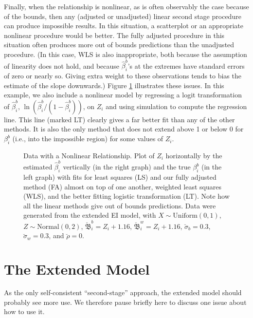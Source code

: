 \documentclass[11pt,titlepage]{article}
\newcommand{\bbeta}{{\mathfrak B}}
\newcommand{\sigmau}{\breve{\sigma}}
\newcommand{\rhou}{\breve{\rho}}
\begin{document}
Finally, when the relationship is nonlinear, as is often observably
the case because of the bounds, then any (adjusted or unadjusted)
linear second stage procedure can produce impossible results.  In this
situation, a scatterplot or an appropriate nonlinear procedure would
be better.  The fully adjusted procedure in this situation often
produces more out of bounds predictions than the unadjusted procedure.
(In this case, WLS is also inappropriate, both because the assumption
of linearity does not hold, and because $\hat\beta_i^b$'s at the
extremes have standard errors of zero or nearly so.  Giving extra
weight to these observations tends to bias the estimate of the slope
downwards.)  Figure \ref{f:nonlinear} illustrates these issues.  In
this example, we also include a nonlinear model by regressing a logit
transformation of $\hat\beta_i^b$,
$\ln(\hat\beta_i^b/(1-\hat\beta_i^b))$, on $Z_i$ and using simulation
to compute the regression line.  This line (marked LT) clearly gives a
far better fit than any of the other methods.  It is also the only
method that does not extend above 1 or below 0 for $\beta_i^b$ (i.e.,
into the impossible region) for some values of $Z_i$.
\begin{figure}[t]
  \begin{center}
    \caption{Data with a Nonlinear Relationship.  Plot of $Z_i$ 
      horizontally by the estimated $\hat\beta_i^b$ vertically (in the
      right graph) and the true $\beta_i^b$ (in the left graph) with
      fits for least squares (LS) and our fully adjusted method (FA)
      almost on top of one another, weighted least squares (WLS), and
      the better fitting logistic transformation (LT).  Note how all
      the linear methods give out of bounds predictions.  Data were
      generated from the extended EI model, with $X \sim
      \textrm{Uniform}(0,1)$, $Z \sim \textrm{Normal}(0,2)$,
      $\breve\bbeta_i^b = Z_i + 1.16$, $\breve\bbeta_i^w = Z_i +
      1.16$, $\sigmau_b = 0.3$, $\sigmau_w = 0.3$, and $\rhou = 0$.}
    \label{f:nonlinear}
  \end{center}
\end{figure}

\section{The Extended Model} \label{s:exten}

As the only self-consistent ``second-stage'' approach, the extended
model should probably see more use.  We therefore pause briefly here
to discuss one issue about how to use it.  
\end{document}

